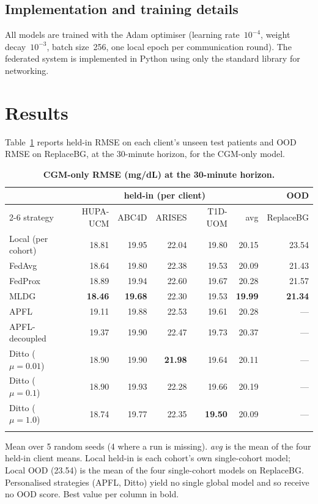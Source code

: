 \documentclass[10pt,letterpaper]{article}
\newlength\savedwidth
\newcommand\thickhline{\noalign{\global\savedwidth\arrayrulewidth\global\arrayrulewidth 2pt}%
\hline
\noalign{\global\arrayrulewidth\savedwidth}}
\begin{document}
\subsection*{Implementation and training details}

All models are trained with the Adam optimiser (learning rate~$10^{-4}$, weight
decay~$10^{-3}$, batch size~256, one local epoch per communication round). The
federated system is implemented in Python using only the standard library for
networking.


\section*{Results}

Table~\ref{tab:main} reports held-in RMSE on each client's unseen test patients
and OOD RMSE on ReplaceBG, at the 30-minute horizon, for the CGM-only model.

\begin{table}[!ht]
\centering
\captionsetup{justification=centering,singlelinecheck=on}
\caption{\bf CGM-only RMSE (mg/dL) at the 30-minute horizon.}
\label{tab:main}
\begin{tabular}{lrrrrrr}
\thickhline
 & \multicolumn{5}{c}{held-in (per client)} & OOD \\
\cline{2-6}
strategy & HUPA-UCM & ABC4D & ARISES & T1D-UOM & avg & ReplaceBG \\
\hline
Local (per cohort) & 18.81 & 19.95 & 22.04 & 19.80 & 20.15 & 23.54 \\
\hline
FedAvg  & 18.64 & 19.80 & 22.38 & 19.53 & 20.09 & 21.43 \\
FedProx & 18.89 & 19.94 & 22.60 & 19.67 & 20.28 & 21.57 \\
MLDG    & \textbf{18.46} & \textbf{19.68} & 22.30 & 19.53 & \textbf{19.99} & \textbf{21.34} \\
\hline
APFL          & 19.11 & 19.88 & 22.53 & 19.61 & 20.28 & --- \\
APFL-decoupled & 19.37 & 19.90 & 22.47 & 19.73 & 20.37 & --- \\
Ditto ($\mu{=}0.01$) & 18.90 & 19.90 & \textbf{21.98} & 19.64 & 20.11 & --- \\
Ditto ($\mu{=}0.1$)  & 18.90 & 19.93 & 22.28 & 19.66 & 20.19 & --- \\
Ditto ($\mu{=}1.0$)  & 18.74 & 19.77 & 22.35 & \textbf{19.50} & 20.09 & --- \\
\thickhline
\end{tabular}
\begin{center}
{\small Mean over 5 random seeds (4 where a run is missing). \emph{avg} is the
mean of the four held-in client means. Local held-in is each cohort's own
single-cohort model; Local OOD (23.54) is the mean of the four single-cohort
models on ReplaceBG. Personalised strategies (APFL, Ditto) yield no single
global model and so receive no OOD score. Best value per column in bold.}
\end{center}
\end{table}
\end{document}
